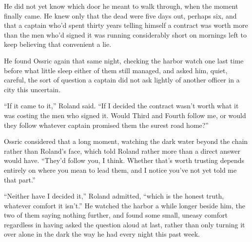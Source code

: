 He did not yet know which door he meant to walk through, when the moment finally came. He knew only that the dead were five days out, perhaps six, and that a captain who’d spent thirty years telling himself a contract was worth more than the men who’d signed it was running considerably short on mornings left to keep believing that convenient a lie.

He found Ossric again that same night, checking the harbor watch one last time before what little sleep either of them still managed, and asked him, quiet, careful, the sort of question a captain did not ask lightly of another officer in a city this uncertain.

“If it came to it,” Roland said. “If I decided the contract wasn’t worth what it was costing the men who signed it. Would Third and Fourth follow me, or would they follow whatever captain promised them the surest road home?”

Ossric considered that a long moment, watching the dark water beyond the chain rather than Roland’s face, which told Roland rather more than a direct answer would have. “They’d follow you, I think. Whether that’s worth trusting depends entirely on where you mean to lead them, and I notice you’ve not yet told me that part.”

“Neither have I decided it,” Roland admitted, “which is the honest truth, whatever comfort it isn’t.” He watched the harbor a while longer beside him, the two of them saying nothing further, and found some small, uneasy comfort regardless in having asked the question aloud at last, rather than only turning it over alone in the dark the way he had every night this past week.
